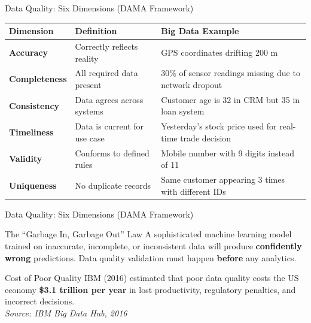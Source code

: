 \documentclass[aspectratio=169,10pt]{beamer}
\begin{document}
\begin{frame}{Data Quality: Six Dimensions (DAMA Framework)}
 \centering
      \renewcommand{\arraystretch}{1.4}
      \begin{tabular}{p{2.0cm}p{4cm}p{7cm}}
        \toprule
        \textbf{Dimension} & \textbf{Definition} & \textbf{Big Data Example} \\
        \midrule
        \textbf{Accuracy}    & Correctly reflects reality & GPS coordinates drifting 200 m \\
        \textbf{Completeness} & All required data present & 30\% of sensor readings missing due to network dropout \\
        \textbf{Consistency} & Data agrees across systems & Customer age is 32 in CRM but 35 in loan system \\
        \textbf{Timeliness}  & Data is current for use case & Yesterday's stock price used for real-time trade decision \\
        \textbf{Validity}    & Conforms to defined rules & Mobile number with 9 digits instead of 11 \\
        \textbf{Uniqueness}  & No duplicate records & Same customer appearing 3 times with different IDs \\
        \bottomrule
      \end{tabular}
 
\end{frame}


\begin{frame}{Data Quality: Six Dimensions (DAMA Framework)}
  
      \begin{alertblock}{The ``Garbage In, Garbage Out'' Law}
        A sophisticated machine learning model trained on inaccurate, incomplete, or inconsistent data will produce \textbf{confidently wrong} predictions.  Data quality validation must happen \textbf{before} any analytics.
      \end{alertblock}
      \vspace{6pt}
      \begin{exampleblock}{Cost of Poor Quality}
        \small IBM (2016) estimated that poor data quality costs the US economy \textbf{\$3.1 trillion per year} in lost productivity, regulatory penalties, and incorrect decisions.\\
        \vspace{2pt}
        \textit{Source: IBM Big Data Hub, 2016}
      \end{exampleblock}
 
\end{frame}
\end{document}
